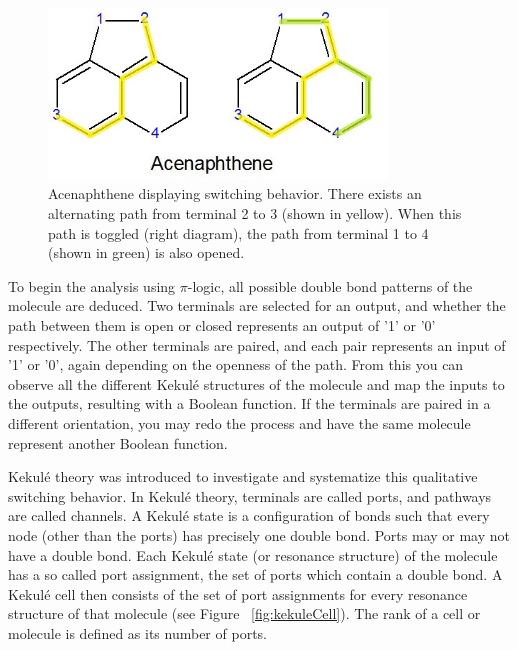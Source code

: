 \documentclass[12pt]{article}
\begin{document}
\begin{figure}[ht!]
\centering
\includegraphics[width=90mm]{AcenaphtheneHighlighted.jpg}
\caption{Acenaphthene displaying switching behavior. There exists an alternating path from terminal 2 to 3 (shown in yellow). When this path is toggled (right diagram), the path from terminal 1 to 4 (shown in green) is also opened.}
\label{fig:acenaptheneHighlighted}
\end{figure}

To begin the analysis using $\pi$-logic, all possible double bond patterns of the molecule are deduced. Two terminals are selected for an output, and whether the path between them is open or closed represents an output of '1' or '0' respectively. The other terminals are paired, and each pair represents an input of '1' or '0', again depending on the openness of the path. From this you can observe all the different Kekul\'e structures of the molecule and map the inputs to the outputs, resulting with a Boolean function. If the terminals are paired in a different orientation, you may redo the process and have the same molecule represent another Boolean function. 

Kekul\'e theory \cite{H13, HH13} was introduced to investigate and systematize this qualitative switching behavior. In Kekul\'e theory, terminals are called ports, and pathways are called channels. A Kekul\'e state is a configuration of bonds such that every node (other than the ports) has precisely one double bond. Ports may or may not have a double bond. Each Kekul\'e state (or resonance structure) of the molecule has a so called port assignment, the set of ports which contain a double bond. A Kekul\'e cell then consists of the set of port assignments for every resonance structure of that molecule (see Figure ~\ref{fig:kekuleCell}). The rank of a cell or molecule is defined as its number of ports.
\end{document}
